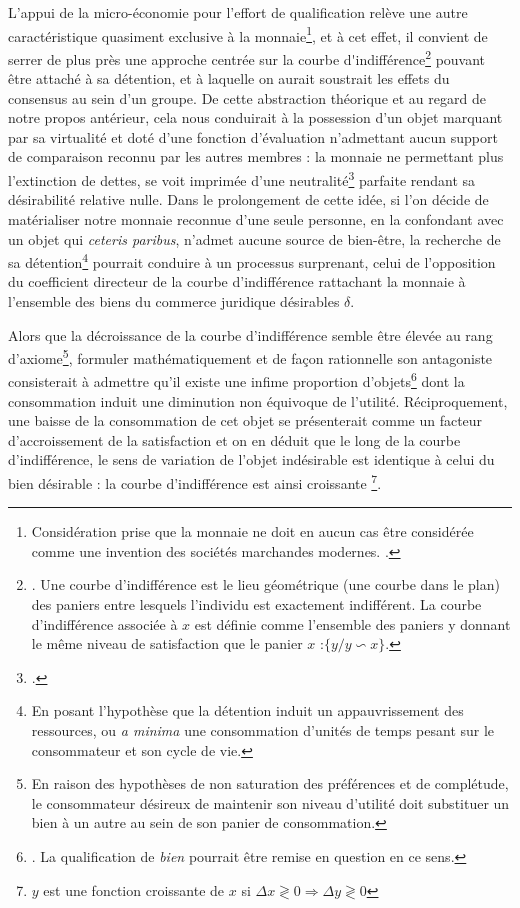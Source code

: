 {L'appui de la micro-économie pour l'effort de qualification relève une autre caractéristique quasiment exclusive à la monnaie\footnote{Considération prise que la monnaie ne doit en aucun cas être considérée comme une invention des sociétés marchandes modernes. .}, et à cet effet, il convient de serrer de plus près une approche centrée sur la \gls{courbe d'indifférence}\footnote{. Une courbe d'indifférence est le lieu géométrique (une courbe dans le plan) des paniers entre lesquels l'individu est exactement indifférent. La courbe d'indifférence associée à $x$ est définie comme l'ensemble des paniers y donnant le même niveau de satisfaction que le panier $x$ :$\lbrace y/y \backsim x \rbrace$.} pouvant être attaché à sa détention, et à laquelle on aurait soustrait les effets du consensus au sein d'un groupe. De cette abstraction théorique et au regard de notre propos antérieur, cela nous conduirait à la possession d'un objet marquant par sa virtualité et doté d'une fonction d'évaluation n'admettant aucun support de comparaison reconnu par les autres membres : la monnaie ne permettant plus l'extinction de dettes, se voit imprimée d'une neutralité\footnote{.} parfaite rendant sa désirabilité relative nulle. Dans le prolongement de cette idée, si l'on décide de matérialiser notre monnaie reconnue d'une seule personne, en la confondant avec un objet qui \emph{ceteris paribus}, n'admet aucune source de bien-être, la recherche de sa détention\footnote{En posant l'hypothèse que la détention induit un appauvrissement des ressources, ou \emph{a minima} une consommation d'unités de temps pesant sur le consommateur et son cycle de vie.} pourrait conduire à un processus surprenant, celui de l'opposition du coefficient directeur de la courbe d'indifférence rattachant la monnaie à l'ensemble des biens du commerce juridique désirables $\delta$.\par 

Alors que la décroissance de la courbe d'indifférence semble être élevée au rang d'axiome\footnote{En raison des hypothèses de non saturation des préférences et de complétude, le consommateur désireux de maintenir son niveau d'utilité doit substituer un bien à un autre au sein de son panier de consommation.}, formuler mathématiquement et de façon rationnelle son antagoniste consisterait à admettre qu'il existe une infime proportion d'objets\footnote{. La qualification de \emph{bien} pourrait être remise en question en ce sens.} dont la consommation induit une diminution non équivoque de l'utilité. Réciproquement, une baisse de la consommation de cet objet se présenterait comme un facteur d'accroissement de la satisfaction et on en déduit que le long de la courbe d'indifférence, le sens de variation de l'objet \og indésirable \fg{} est identique à celui du bien désirable : la courbe d'indifférence est ainsi croissante \footnote{$y$ est une fonction croissante de $x$ si $\Delta x \gtrless{} 0 \Rightarrow \Delta y \gtrless{} 0$}.\par

}
